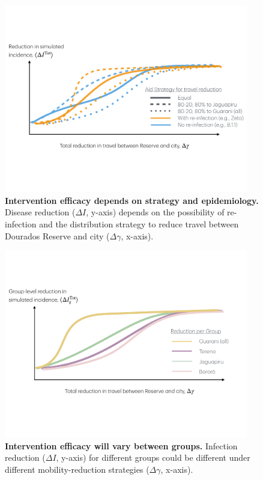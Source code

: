 \documentclass[
  letterpaper,
  abstract]{scrartcl}
\begin{document}
\begin{figure}[H]

\caption{\textbf{Intervention efficacy depends on strategy and epidemiology.} Disease reduction ($\Delta I$, y-axis) depends on the possibility of
  re-infection and the
distribution strategy to reduce travel between Dourados Reserve and city ($\Delta \gamma$, x-axis).}
\label{fig:ByReinfectionByStrategy}
\vspace{0.3em}
{\centering
  \includegraphics[width=0.95\textwidth,height=\textheight]{Figures/ResultsSketch_ByReinfectionByStrategy.pdf}

}


\end{figure}%

\begin{figure}[H]

\caption{\textbf{Intervention efficacy will vary between groups.} 
Infection reduction ($\Delta I$, y-axis) for different groups could be
different under different mobility-reduction strategies
($\Delta \gamma$, x-axis).}
\label{fig:ByGroupReduction_GlobalStrategy}
\vspace{0.3em}
{\centering \includegraphics[width=0.95\textwidth,height=\textheight]{Figures/ResultsSketch_ReductionByGroup.pdf}

}

\end{figure}%
\end{document}
